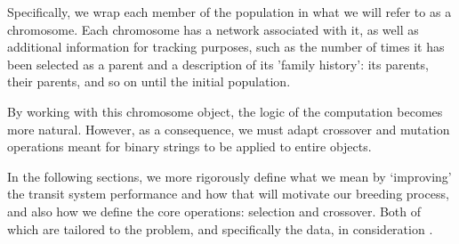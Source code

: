 \documentclass[11pt]{amsart}
\theoremstyle{definition}                  %
\theoremstyle{remark}                       %
\numberwithin{equation}{section}
\begin{document}
Specifically, we wrap each member of the population in what we will refer to as a chromosome. Each chromosome has a network associated with it, as well as additional information for tracking purposes, such as the number of times it has been selected as a parent and a description of its 'family history': its parents, their parents, and so on until the initial population. 

 By working with this chromosome object, the logic of the computation becomes more natural. However, as a consequence, we must adapt crossover and mutation operations meant for binary strings to be applied to entire objects. 
 
 In the following sections, we more rigorously define what we mean by `improving' the transit system performance and how that will motivate our breeding process, and also how we define the core operations: selection and crossover. Both of which are tailored to the problem, and specifically the data, in consideration \cite{park2005}.
\end{document}
